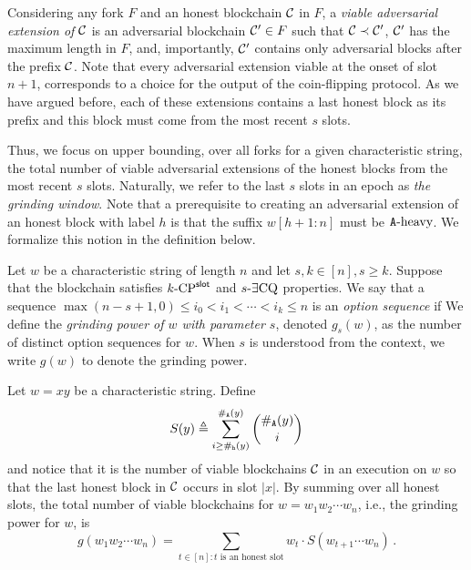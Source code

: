 Considering any fork $F$ and an honest blockchain $\mathcal{C}$ in $F$, 
a \emph{viable adversarial extension of $\mathcal{C}$} 
is an adversarial blockchain $\mathcal{C}' \in F$ 
such that $\mathcal{C} \prec \mathcal{C}'$, 
$\mathcal{C}'$ has the maximum length in $F$, 
and, importantly, $\mathcal{C}'$ contains only adversarial blocks after the prefix $\mathcal{C}$. 
Note that every adversarial extension 
viable at the onset of slot $n + 1$, 
corresponds to a choice 
for the output of the coin-flipping protocol. 
As we have argued before, 
each of these extensions contains a last honest block as its prefix 
and this block must come from the most recent $s$ slots.

Thus, we focus on upper bounding, 
over all forks for a given characteristic string, 
the total number of viable adversarial extensions 
of the honest blocks from the most recent $s$ slots.
Naturally, we refer to the last $s$ slots in an epoch as \emph{the grinding window}.
Note that a prerequisite to creating an adversarial extension 
of an honest block with label $h$ is that 
the suffix $w[h + 1 : n]$ must be $\mathtt{A}\text{-heavy}$.
We formalize this notion in the definition below.

\begin{definition}\label{def:option-sequence}
  Let $w$ be a characteristic string of length $n$ 
  and let $s, k \in [n], s \geq k$. 
  Suppose that the blockchain satisfies ${k}\text{-}\mathrm{CP}^{\mathsf{slot}}$ and ${s}\text{-}\exists\mathrm{CQ}$ properties.
  We say that a sequence
  $
    \max(n-s+1,0) \leq i_0 < i_1 < \cdots < i_k \leq n
  $
  is an \emph{option sequence} if
  We define the \emph{grinding power of $w$ with parameter $s$}, denoted $g_s(w)$, 
  as the 
  number of distinct option sequences for $w$. 
  When $s$ is understood from the context, 
  we write $g(w)$ to denote the grinding power.
\end{definition}
\noindent


Let $w = xy$ be a characteristic string. 
Define
\begin{equation}\label{eq:S_y}
    S(y) 
    \triangleq \sum_{i \geq \#_{\mathtt{h}}(y)}^{\#_{\mathtt{A}}(y)}{ \binom{\#_{\mathtt{A}}(y)}{i} } 
\end{equation}
and notice that it is the number of viable blockchains $\mathcal{C}$
in an execution on $w$ 
so that the last honest block in $\mathcal{C}$ occurs in slot $|x|$. 
By summing over all honest slots, 
the total number of viable blockchains for $w = w_1 w_2 \cdots w_n$,
i.e., the grinding power for $w$, is 
\begin{equation}\label{eq:g_praos}
    g(w_1 w_2 \cdots w_n) 
    = \sum_{ \text{$t \in [n] : t$ is an honest slot} }
      w_t \cdot S(w_{t+1} \cdots w_n)
    \,.  
\end{equation}

